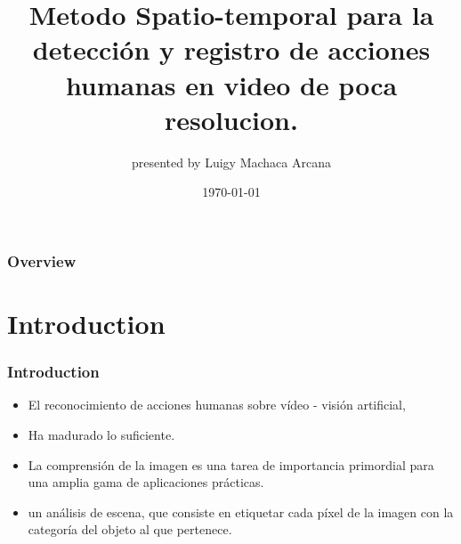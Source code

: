 \documentclass{beamer}
\title[xx]{Metodo Spatio-temporal para la detección y registro de acciones humanas en video de poca resolucion. } %
\subtitle{}
\author[Autores]{
\small{presented by} 
\newline \normalsize {Luigy Machaca Arcana} }  %
\institute[UNSA] %
{
Universidad Nacional de San Agustín\\ %
\medskip
}
\date{\today} %
\begin{document}
\begin{frame}
\titlepage %
\end{frame}

\begin{frame}
\frametitle{Overview} %
\tableofcontents %
\end{frame}


\section{Introduction}



\begin{frame}
\frametitle{Introduction}
\begin{itemize}
\item El reconocimiento de acciones humanas sobre vídeo - visión artificial, 
\item Ha madurado lo suficiente.
\item La comprensión de la imagen es una tarea de importancia primordial para una amplia gama de aplicaciones prácticas.
\item un análisis de escena, que consiste en etiquetar cada píxel de la imagen con la categoría del objeto al que pertenece.
\end{itemize}
\end{frame}
\end{document}
